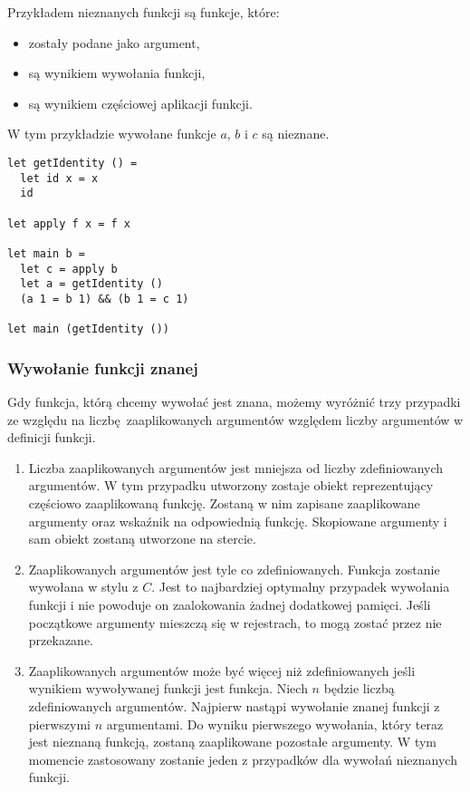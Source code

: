 \documentclass[declaration,shortabstract]{iithesis}
\begin{document}
Przykładem nieznanych funkcji są funkcje, które: 
\begin{itemize}
  \item zostały podane jako argument,
  \item są wynikiem wywołania funkcji,
  \item są wynikiem częściowej aplikacji funkcji.
\end{itemize}

W tym przykładzie wywołane funkcje $a$, $b$ i $c$ są nieznane.

\begin{lstlisting}[frame=single, caption=Przykłady statycznie 
nieznanej funkcji.]
let getIdentity () = 
  let id x = x 
  id

let apply f x = f x

let main b = 
  let c = apply b 
  let a = getIdentity ()
  (a 1 = b 1) && (b 1 = c 1)

let main (getIdentity ())
\end{lstlisting}

\subsubsection{Wywołanie funkcji znanej}

Gdy funkcja, którą chcemy wywołać jest znana, możemy wyróżnić trzy przypadki 
ze względu na liczbę zaaplikowanych argumentów względem liczby argumentów
w definicji funkcji.

\begin{enumerate}
  \item Liczba zaaplikowanych argumentów jest mniejsza od liczby zdefiniowanych 
  argumentów. W tym przypadku utworzony zostaje obiekt reprezentujący częściowo
  zaaplikowaną funkcję. Zostaną w nim zapisane zaaplikowane argumenty 
  oraz 
  wskaźnik na odpowiednią funkcję. Skopiowane argumenty i sam obiekt 
  zostaną 
  utworzone na stercie.
  \item Zaaplikowanych argumentów jest tyle co zdefiniowanych. Funkcja 
  zostanie
  wywołana w stylu z $C$. Jest to najbardziej optymalny przypadek 
  wywołania 
  funkcji i nie powoduje on zaalokowania żadnej dodatkowej pamięci. Jeśli 
  początkowe argumenty mieszczą się w rejestrach, to mogą zostać przez 
  nie przekazane.
  \item Zaaplikowanych argumentów może być więcej niż zdefiniowanych 
  jeśli wynikiem wywoływanej funkcji jest funkcja. Niech $n$ będzie 
  liczbą zdefiniowanych argumentów. Najpierw nastąpi wywołanie znanej 
  funkcji z 
  pierwszymi $n$ argumentami. Do wyniku pierwszego wywołania, który teraz 
  jest
  nieznaną funkcją, zostaną zaaplikowane pozostałe argumenty. W tym 
  momencie 
  zastosowany zostanie jeden z przypadków dla wywołań nieznanych funkcji.

\end{enumerate}
\end{document}
